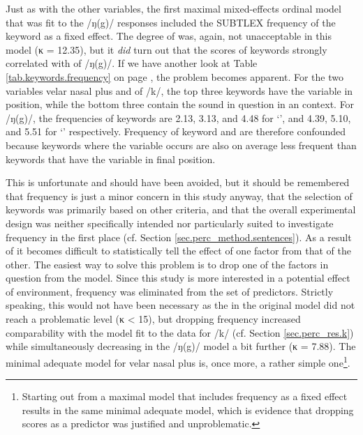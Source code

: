 Just as with the other variables, the first maximal mixed-effects ordinal model that was fit to the /ŋ(g)/ responses included the SUBTLEX frequency of the keyword as a fixed effect.
The degree of  was, again, not unacceptable in this model (κ = 12.35), but it \emph{did} turn out that the  scores of keywords strongly correlated with  of /ŋ(g)/.
If we have another look at Table \ref{tab.keywords.frequency} on page \pageref{tab.keywords.frequency}, the problem becomes apparent.
For the two  variables velar nasal plus and  of /k/, the top three keywords have the variable in  position, while the bottom three contain the sound in question in an  context.
For /ŋ(g)/, the frequencies of keywords are 2.13, 3.13, and 4.48 for `', and 4.39, 5.10, and 5.51 for `' respectively.
Frequency of keyword and  are therefore confounded because keywords where the variable occurs  are also on average less frequent than keywords that have the variable in final position.

This is unfortunate and should have been avoided, but it should be remembered that frequency is just a minor concern in this study anyway, that the selection of keywords was primarily based on other criteria, and that the overall experimental design was neither specifically intended nor particularly suited to investigate frequency in the first place (cf. Section \ref{sec.perc_method.sentences}).
As a result of  it becomes difficult to statistically tell the effect of one factor from that of the other.
The easiest way to solve this problem is to drop one of the factors in question from the model.
Since this study is more interested in a potential effect of environment, frequency was eliminated from the set of predictors.
Strictly speaking, this would not have been necessary as the  in the original model did not reach a problematic level (κ < 15), but dropping frequency increased comparability with the model fit to the data for /k/ (cf. Section \ref{sec.perc_res.k}) while simultaneously decreasing  in the /ŋ(g)/ model a bit further (κ = 7.88).
The minimal adequate model for velar nasal plus is, once more, a rather simple one\footnote{Starting out from a maximal model that includes frequency as a fixed effect results in the same minimal adequate model, which is evidence that dropping  scores as a predictor was justified and unproblematic.}.

